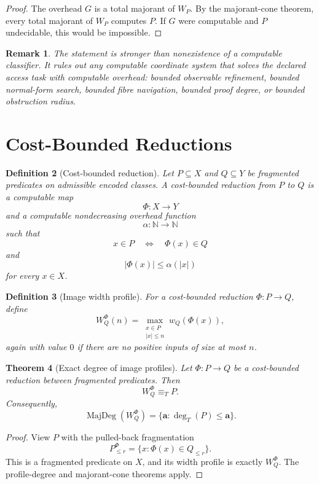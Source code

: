 \documentclass[11pt]{article}
\newtheorem{theorem}{Theorem}[section]
\newtheorem{definition}[theorem]{Definition}
\newtheorem{remark}[theorem]{Remark}
\begin{document}
\begin{proof}
The overhead \(G\) is a total majorant of \(W_P\). By the majorant-cone theorem, every total majorant of \(W_P\) computes \(P\). If \(G\) were computable and \(P\) undecidable, this would be impossible.
\end{proof}

\begin{remark}
The statement is stronger than nonexistence of a computable classifier. It rules out any computable coordinate system that solves the declared access task with computable overhead: bounded observable refinement, bounded normal-form search, bounded fibre navigation, bounded proof degree, or bounded obstruction radius.
\end{remark}

\section{Cost-Bounded Reductions}

\begin{definition}[Cost-bounded reduction]
Let \(P\subseteq X\) and \(Q\subseteq Y\) be fragmented predicates on admissible encoded classes. A cost-bounded reduction from \(P\) to \(Q\) is a computable map
\[
\Phi:X\to Y
\]
and a computable nondecreasing overhead function
\[
\alpha:\mathbb N\to\mathbb N
\]
such that
\[
x\in P
\quad\Longleftrightarrow\quad
\Phi(x)\in Q
\]
and
\[
|\Phi(x)|\le \alpha(|x|)
\]
for every \(x\in X\).
\end{definition}

\begin{definition}[Image width profile]
For a cost-bounded reduction \(\Phi:P\to Q\), define
\[
W_Q^\Phi(n)
=
\max_{\substack{x\in P\\ |x|\le n}}
w_Q(\Phi(x)),
\]
again with value \(0\) if there are no positive inputs of size at most \(n\).
\end{definition}

\begin{theorem}[Exact degree of image profiles]
Let \(\Phi:P\to Q\) be a cost-bounded reduction between fragmented predicates. Then
\[
W_Q^\Phi\equiv_T P.
\]
Consequently,
\[
\operatorname{MajDeg}(W_Q^\Phi)
=
\{\mathbf a:\deg_T(P)\le \mathbf a\}.
\]
\end{theorem}

\begin{proof}
View \(P\) with the pulled-back fragmentation
\[
P_{\le r}^{\Phi}=\{x:\Phi(x)\in Q_{\le r}\}.
\]
This is a fragmented predicate on \(X\), and its width profile is exactly \(W_Q^\Phi\). The profile-degree and majorant-cone theorems apply.
\end{proof}
\end{document}
